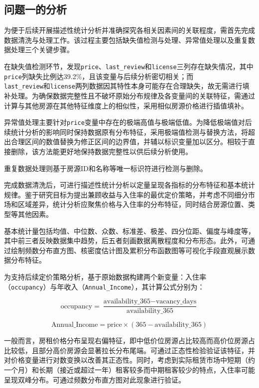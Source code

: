 \documentclass[12pt]{article}
\begin{document}
\begin{CJK}{UTF8}{gbsn}
	\subsection{问题一的分析}
	为便于后续开展描述性统计分析并准确探究各相关因素间的关联程度，需首先完成数据清洗与处理工作。该过程主要包括缺失值检测与处理、异常值处理以及重复数据处理三个关键步骤。
	
	在缺失值检测环节，发现\texttt{price}、\texttt{last\_review}和\texttt{license}三列存在缺失情况，其中\texttt{price}列缺失比例达39.2\%，且该变量与后续分析密切相关；而\\\texttt{last\_review}和\texttt{license}两列数据因其特性本身可能存在合理缺失，故无需进行填补处理。为确保数据完整性且不破坏原始分布规律及各变量间的关联特征，需通过计算与其他房源在其他特征维度上的相似性，采用相似房源价格进行插值填补。
	
	异常值处理主要针对\texttt{price}变量中存在的极端高值与极端低值。为降低极端值对后续统计分析的影响同时保持数据原有分布特征，采用极端值检测与替换方法，将超出合理区间的数值替换为修正区间的边界值，并辅以标识变量加以区分。相较于直接删除，该方法能更好地保持数据完整性以供后续分析使用。
	
	重复数据处理则基于房源ID和名称等唯一标识符进行检测与删除。
	
	完成数据清洗后，可进行描述性统计分析以定量呈现各指标的分布特征和基本统计规律。鉴于研究目标为提出兼顾收益与入住率的最优定价策略，并考虑不同细分市场和区域差异，统计分析应聚焦价格与入住率的分布特征，同时结合房源位置、类型等其他因素。
	
	基本统计量包括均值、中位数、众数、标准差、极差、四分位距、偏度与峰度等，其中前三者反映数据集中趋势，后五者刻画数据离散程度和分布形态。此外，可通过绘制频数分布直方图、核密度估计图及累积分布函数图等可视化手段直观展示数据分布特征。
	
	为支持后续定价策略分析，基于原始数据构建两个新变量：入住率\\（\texttt{occupancy}）与年收入（\texttt{Annual\_Income}），其计算公式分别为：
	
	\begin{equation}
		\text{occupancy} = \frac{\text{availability\_365} - \text{vacancy\_days}}{\text{availability\_365}}
	\end{equation}
	
	
	\begin{equation}
	\text{Annual\_Income} = \text{price} \times (365 - \text{availability\_365})
	\end{equation}
	
	一般而言，房租价格分布呈现右偏特征，即中低价位房源占比较高而高价位房源占比较低，且部分高价房源会显著拉长分布尾端。可通过正态性检验验证该特征，并对价格变量进行对数变换以改善其正态性。同时，考虑到实际租赁市场中短期（约一个月）和长期（接近或超过一年）租客较多而中期租客较少的特点，入住率可能呈现双峰分布。可通过频数分布直方图对此现象进行验证。
	

\end{CJK}
\end{document}
